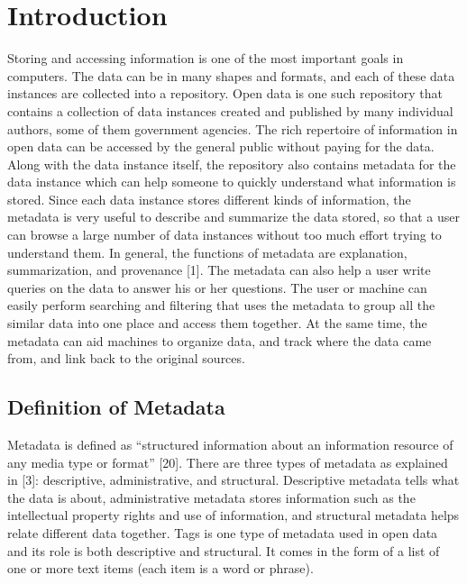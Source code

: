 
\chapter{Introduction}
\label{ch:Introduction}

Storing and accessing information is one of the most important goals in computers. The data can be in many shapes and formats, and each of these data instances are collected into a repository. Open data is one such repository that contains a collection of data instances created and published by many individual authors, some of them government agencies. The rich repertoire of information in open data can be accessed by the general public without paying for the data. Along with the data instance itself, the repository also contains metadata for the data instance which can help someone to quickly understand what information is stored. Since each data instance stores different kinds of information, the metadata is very useful to describe and summarize the data stored, so that a user can browse a large number of data instances without too much effort trying to understand them. In general, the functions of metadata are explanation, summarization, and provenance [1]. The metadata can also help a user write queries on the data to answer his or her questions. The user or machine can easily perform searching and filtering that uses the metadata to group all the similar data into one place and access them together. At the same time, the metadata can aid machines to organize data, and track where the data came from, and link back to the original sources.

\section{Definition of Metadata}
\label{sec:DefinitionOfMetadata}

Metadata is defined as “structured information about an information resource of any media type or format” [20]. There are three types of metadata as explained in [3]: descriptive, administrative, and structural. Descriptive metadata tells what the data is about, administrative metadata stores information such as the intellectual property rights and use of information, and
structural metadata helps relate different data together. Tags is one type of metadata used in open data and its role is both descriptive and structural. It comes in the form of a list of one or more text items (each item is a word or phrase).

